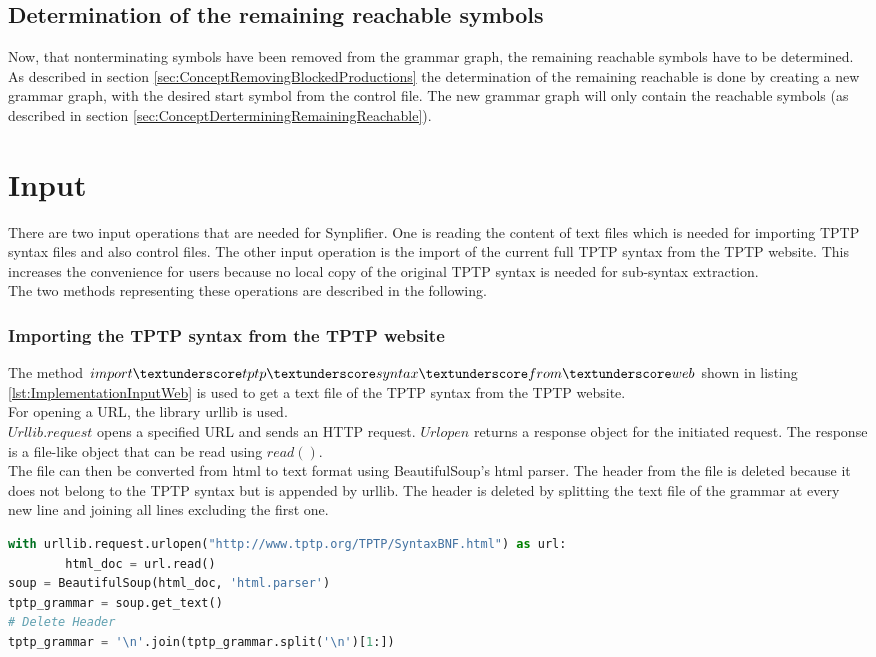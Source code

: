 \subsection{Determination of the remaining reachable symbols}

Now, that nonterminating symbols have been removed from the grammar graph, the remaining reachable symbols have to be determined.
As described in section \ref{sec:ConceptRemovingBlockedProductions} the determination of the remaining reachable is done by creating a new grammar graph, with the desired start symbol from the control file.
The new grammar graph will only contain the reachable symbols (as described in section \ref{sec:ConceptDerterminingRemainingReachable}). 

\section{Input}\label{sec:ImplementationInput}
There are two input operations that are needed for \ac{Synplifier}.
One is reading the content of text files which is needed for importing \ac{TPTP} syntax files and also control files.
The other input operation is the import of the current full \ac{TPTP} syntax from the \ac{TPTP} website.
This increases the convenience for users because no local copy of the original \ac{TPTP} syntax is needed for sub-syntax extraction.\\
The two methods representing these operations are described in the following.

\subsubsection{Importing the \ac{TPTP} syntax from the \ac{TPTP} website}

The method $import\textunderscore tptp\textunderscore syntax\textunderscore from\textunderscore web$ shown in listing \ref{lst:ImplementationInputWeb} is used to get a text file of the \ac{TPTP} syntax from the \ac{TPTP} website. \\
For opening a \ac{URL}, the library urllib is used. \\ $Urllib.request$ opens a specified \ac{URL} and sends an HTTP request. $Urlopen$ returns a response object for the initiated request. The response is a file-like object that can be read using $read()$. \cite{urllib} \\
The file can then be converted from html to text format using BeautifulSoup's html parser.
The header from the file is deleted because it does not belong to the \ac{TPTP} syntax but is appended by urllib. The header is deleted by splitting the text file of the grammar at every new line and joining all lines excluding the first one.
\newpage
\begin{lstlisting}[language=Python, basicstyle=\scriptsize	, caption= Import TPTP syntax from the \ac{TPTP} website, label= lst:ImplementationInputWeb]
with urllib.request.urlopen("http://www.tptp.org/TPTP/SyntaxBNF.html") as url:
        html_doc = url.read()
soup = BeautifulSoup(html_doc, 'html.parser')
tptp_grammar = soup.get_text()
# Delete Header
tptp_grammar = '\n'.join(tptp_grammar.split('\n')[1:])
\end{lstlisting}

